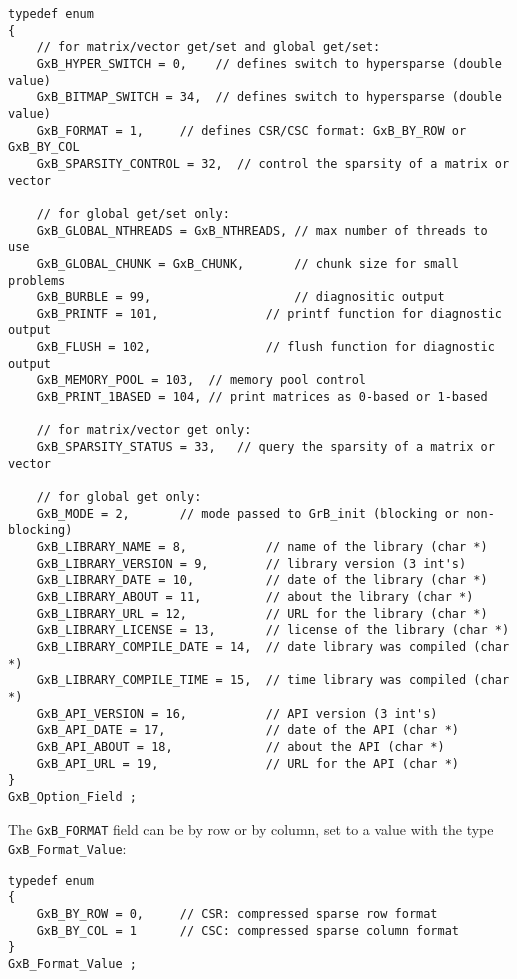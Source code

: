 \documentclass[12pt]{article}
\begin{document}
{\footnotesize
\begin{verbatim}
typedef enum
{
    // for matrix/vector get/set and global get/set:
    GxB_HYPER_SWITCH = 0,    // defines switch to hypersparse (double value)
    GxB_BITMAP_SWITCH = 34,  // defines switch to hypersparse (double value)
    GxB_FORMAT = 1,     // defines CSR/CSC format: GxB_BY_ROW or GxB_BY_COL
    GxB_SPARSITY_CONTROL = 32,  // control the sparsity of a matrix or vector

    // for global get/set only:
    GxB_GLOBAL_NTHREADS = GxB_NTHREADS, // max number of threads to use
    GxB_GLOBAL_CHUNK = GxB_CHUNK,       // chunk size for small problems
    GxB_BURBLE = 99,                    // diagnositic output
    GxB_PRINTF = 101,               // printf function for diagnostic output
    GxB_FLUSH = 102,                // flush function for diagnostic output
    GxB_MEMORY_POOL = 103,  // memory pool control
    GxB_PRINT_1BASED = 104, // print matrices as 0-based or 1-based

    // for matrix/vector get only:
    GxB_SPARSITY_STATUS = 33,   // query the sparsity of a matrix or vector

    // for global get only:
    GxB_MODE = 2,       // mode passed to GrB_init (blocking or non-blocking)
    GxB_LIBRARY_NAME = 8,           // name of the library (char *)
    GxB_LIBRARY_VERSION = 9,        // library version (3 int's)
    GxB_LIBRARY_DATE = 10,          // date of the library (char *)
    GxB_LIBRARY_ABOUT = 11,         // about the library (char *)
    GxB_LIBRARY_URL = 12,           // URL for the library (char *)
    GxB_LIBRARY_LICENSE = 13,       // license of the library (char *)
    GxB_LIBRARY_COMPILE_DATE = 14,  // date library was compiled (char *)
    GxB_LIBRARY_COMPILE_TIME = 15,  // time library was compiled (char *)
    GxB_API_VERSION = 16,           // API version (3 int's)
    GxB_API_DATE = 17,              // date of the API (char *)
    GxB_API_ABOUT = 18,             // about the API (char *)
    GxB_API_URL = 19,               // URL for the API (char *)
}
GxB_Option_Field ;
\end{verbatim} }

The \verb'GxB_FORMAT' field can be by row or by column, set to a value
with the type \verb'GxB_Format_Value':

{\footnotesize
\begin{verbatim}
typedef enum
{
    GxB_BY_ROW = 0,     // CSR: compressed sparse row format
    GxB_BY_COL = 1      // CSC: compressed sparse column format
}
GxB_Format_Value ;
\end{verbatim} }
\end{document}

